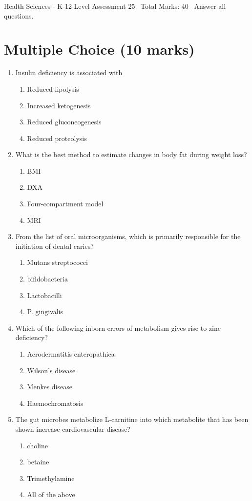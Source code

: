 \documentclass[12pt]{article}
\begin{document}
\begin{center}
Health Sciences - K-12 Level Assessment 25 \
Total Marks: 40 \
Answer all questions.
\end{center}

\section*{Multiple Choice (10 marks)}
\begin{enumerate}[label=\arabic*.]
\item Insulin deficiency is associated with
\begin{enumerate}[label=(\alph*)]
    \item Reduced lipolysis
    \item Increased ketogenesis
    \item Reduced gluconeogenesis
    \item Reduced proteolysis
\end{enumerate}
\item What is the best method to estimate changes in body fat during weight loss?
\begin{enumerate}[label=(\alph*)]
    \item BMI
    \item DXA
    \item Four-compartment model
    \item MRI
\end{enumerate}
\item From the list of oral microorganisms, which is primarily responsible for the initiation of dental caries?
\begin{enumerate}[label=(\alph*)]
    \item Mutans streptococci
    \item bifidobacteria
    \item Lactobacilli
    \item P. gingivalis
\end{enumerate}
\item Which of the following inborn errors of metabolism gives rise to zinc deficiency?
\begin{enumerate}[label=(\alph*)]
    \item Acrodermatitis enteropathica
    \item Wilson's disease
    \item Menkes disease
    \item Haemochromatosis
\end{enumerate}
\item The gut microbes metabolize L-carnitine into which metabolite that has been shown increase cardiovascular disease?
\begin{enumerate}[label=(\alph*)]
    \item choline
    \item betaine
    \item Trimethylamine
    \item All of the above
\end{enumerate}
\end{enumerate}
\end{document}
